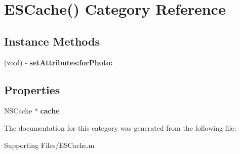 \hypertarget{category_e_s_cache_07_08}{}\section{E\+S\+Cache() Category Reference}
\label{category_e_s_cache_07_08}
\subsection*{Instance Methods}
\begin{DoxyCompactItemize}
\item 
\hypertarget{category_e_s_cache_07_08_a41ea9d1eee6d04547f4aa539652eb417}{}(void) -\/ {\bfseries set\+Attributes\+:for\+Photo\+:}\label{category_e_s_cache_07_08_a41ea9d1eee6d04547f4aa539652eb417}

\end{DoxyCompactItemize}
\subsection*{Properties}
\begin{DoxyCompactItemize}
\item 
\hypertarget{category_e_s_cache_07_08_a17f6a9a7eefa8d4776cbff453b98462c}{}N\+S\+Cache $\ast$ {\bfseries cache}\label{category_e_s_cache_07_08_a17f6a9a7eefa8d4776cbff453b98462c}

\end{DoxyCompactItemize}


The documentation for this category was generated from the following file\+:\begin{DoxyCompactItemize}
\item 
Supporting Files/E\+S\+Cache.\+m\end{DoxyCompactItemize}
